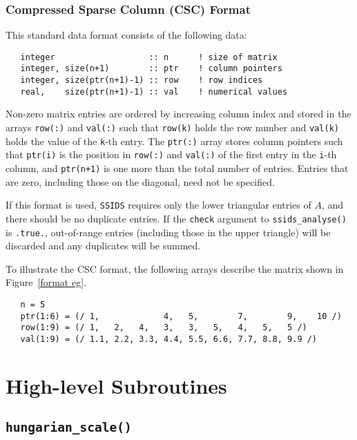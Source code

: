 \subsubsection{Compressed Sparse Column (CSC) Format} \label{cscformat}
This standard data format consists of the following data:
\begin{verbatim}
   integer                   :: n      ! size of matrix
   integer, size(n+1)        :: ptr    ! column pointers
   integer, size(ptr(n+1)-1) :: row    ! row indices
   real,    size(ptr(n+1)-1) :: val    ! numerical values
\end{verbatim}
Non-zero matrix entries are ordered by increasing column index and stored in
the arrays \texttt{row(:)} and \texttt{val(:)} such that \texttt{row(k)} holds
the row number and \texttt{val(k)} holds the value of the \texttt{k}-th entry.
The \texttt{ptr(:)} array stores column pointers such that \texttt{ptr(i)} is
the position in \texttt{row(:)} and \texttt{val(:)} of
the first entry in the \texttt{i}-th column, and \texttt{ptr(n+1)} is one more
than the total number of entries.
Entries that are zero, including those on the diagonal, need not be specified.

If this format is used, \texttt{SSIDS} requires only the lower triangular entries of $A$, and there 
should be no duplicate entries. If the \texttt{check}
argument to
\texttt{ssids\_analyse()} is \texttt{.true.}, out-of-range entries (including
those in the upper triangle) will be discarded and any duplicates will be
summed.

To illustrate the CSC format, the following arrays describe the matrix shown in
Figure~\ref{format eg}.
\begin{verbatim}
   n = 5
   ptr(1:6) = (/ 1,             4,   5,        7,        9,    10 /)
   row(1:9) = (/ 1,   2,   4,   3,   3,   5,   4,   5,   5 /)
   val(1:9) = (/ 1.1, 2.2, 3.3, 4.4, 5.5, 6.6, 7.7, 8.8, 9.9 /)
\end{verbatim}


\section{High-level Subroutines}


\subsection{\texttt{hungarian\_scale()}}

